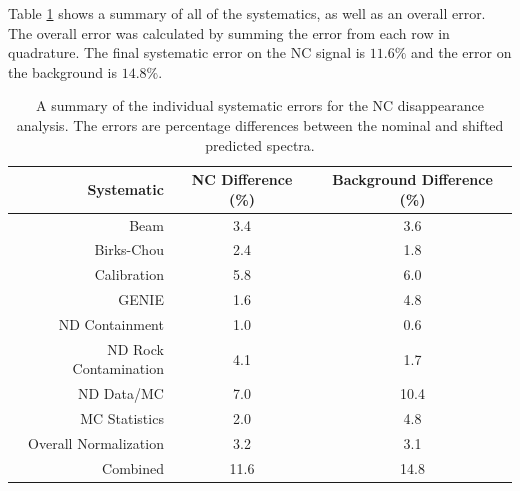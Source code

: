 Table \ref{tab:SystSummary} shows a summary of all of the systematics, as well as an overall error. The overall error was calculated by summing the error from each row in quadrature. The final systematic error on the NC signal is $11.6\%$ and the error on the background is $14.8\%$.
\begin{table}[htb]
  \begin{center}
    \caption[Systematic Error Summary]{A summary of the individual systematic errors for the NC disappearance analysis. The errors are percentage differences between the nominal and shifted predicted spectra.}
    \label{tab:SystSummary}
    \begin{tabular}{r c c}
      \hline\hline
      Systematic & NC Difference (\%) & Background Difference (\%) \\
      \hline
      Beam & 3.4 & 3.6 \\
      Birks-Chou & 2.4 & 1.8 \\
      Calibration & 5.8 & 6.0 \\
      GENIE & 1.6 & 4.8 \\
      ND Containment & 1.0 & 0.6 \\
      ND Rock Contamination & 4.1 & 1.7 \\
      ND Data/MC & 7.0 & 10.4 \\
      MC Statistics & 2.0 & 4.8 \\
      Overall Normalization & 3.2 & 3.1 \\
      \hline
      Combined & 11.6 & 14.8 \\
      \hline
    \end{tabular}
  \end{center}
\end{table}

